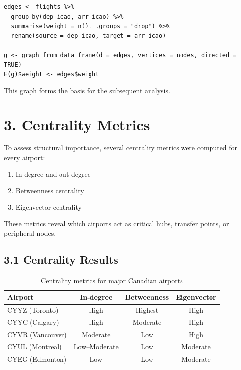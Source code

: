 \documentclass[10pt]{article}
\begin{document}
\begin{verbatim}
edges <- flights %>%
  group_by(dep_icao, arr_icao) %>%
  summarise(weight = n(), .groups = "drop") %>%
  rename(source = dep_icao, target = arr_icao)

g <- graph_from_data_frame(d = edges, vertices = nodes, directed = TRUE)
E(g)$weight <- edges$weight
\end{verbatim}

This graph forms the basis for the subsequent analysis.

\section*{3. Centrality Metrics}

To assess structural importance, several centrality metrics were computed for every airport:

\begin{enumerate}[label=\arabic*.]
    \item In-degree and out-degree
    \item Betweenness centrality
    \item Eigenvector centrality
\end{enumerate}

These metrics reveal which airports act as critical hubs, transfer points, or peripheral nodes.

\subsection*{3.1 Centrality Results}

\begin{table}[h!]
    \centering
    \caption{Centrality metrics for major Canadian airports}
    \begin{tabular}{lccc}
        \toprule
        Airport & In-degree & Betweenness & Eigenvector \\
        \midrule
        CYYZ (Toronto)   & High & Highest & High \\
        CYYC (Calgary)   & High & Moderate & High \\
        CYVR (Vancouver) & Moderate & Low & High \\
        CYUL (Montreal)  & Low–Moderate & Low & Moderate \\
        CYEG (Edmonton)  & Low & Low & Moderate \\
        \bottomrule
    \end{tabular}
\end{table}
\end{document}
